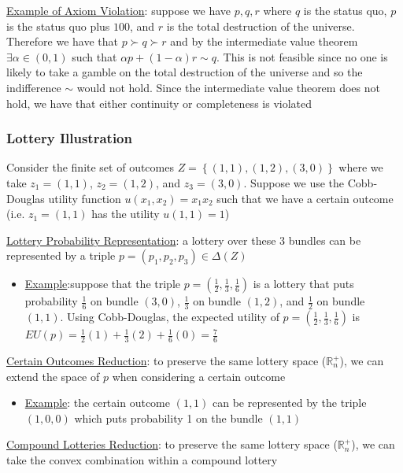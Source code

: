 \documentclass{article}
\begin{document}
  \par
  \underline{Example of Axiom Violation}: suppose we have $p, q, r$ where $q$ is the status quo, $p$ is the status quo plus $100$, and $r$ is the total destruction of the universe. Therefore we have that $p \succ q \succ r$ and by the intermediate value theorem $\exists \alpha \in (0,1)$ such that $\alpha p + (1- \alpha)r \sim q$. This is not feasible since no one is likely to take a gamble on the total destruction of the universe and so the indifference $\sim$ would not hold. Since the intermediate value theorem does not hold, we have that either continuity or completeness is violated
\vspace{6mm}
\subsubsection{Lottery Illustration}
Consider the finite set of outcomes $Z = \left\{ (1,1), (1,2), (3,0) \right\}$ where we take $z_{1} = (1,1)$, $z_{2} = (1,2)$, and $z_{3} = (3,0)$. Suppose we use the Cobb-Douglas utility function $u(x_{1}, x_{2}) = x_{1}x_{2}$ such that we have a certain outcome (i.e. $z_{1} = (1,1)$ has the utility $u(1,1) = 1$) \par \vspace{6mm}
  \underline{Lottery Probability Representation}: a lottery over these 3 bundles can be represented by a triple $p = (p_{1}, p_{2}, p_{3}) \in \Delta (Z)$
  \begin{itemize}
    \item  \underline{Example}:suppose that the triple $p = (\tfrac{1}{2}, \tfrac{1}{3}, \tfrac{1}{6})$ is a lottery that puts probability $\tfrac{1}{6}$ on bundle $(3,0)$, $\tfrac{1}{3}$ on bundle $(1,2)$, and $\frac{1}{2}$ on bundle $(1,1)$. Using Cobb-Douglas, the expected utility of $p = (\tfrac{1}{2}, \tfrac{1}{3}, \tfrac{1}{6})$ is $EU(p) = \tfrac{1}{2}(1) + \tfrac{1}{3}(2) + \tfrac{1}{6}(0) = \tfrac{7}{6}$
  \end{itemize}
  \par
  \underline{Certain Outcomes Reduction}: to preserve the same lottery space ($\mathbb{R}^{+}_{n}$), we can extend the space of $p$ when considering a certain outcome
  \begin{itemize}
    \item  \underline{Example}: the certain outcome $(1,1)$ can be represented by the triple $(1,0,0)$ which puts probability 1 on the bundle $(1,1)$
  \end{itemize}
  \par
  \underline{Compound Lotteries Reduction}: to preserve the same lottery space ($\mathbb{R}^{+}_{n}$), we can take the convex combination within a compound lottery
\end{document}
